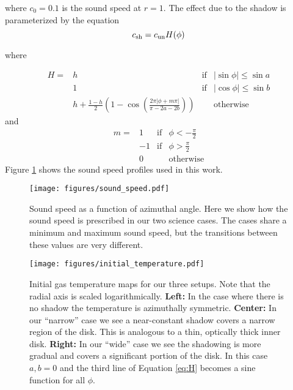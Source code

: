 \documentclass[twocolumn]{aastex631}
\begin{document}
where $c_0 = 0.1$ is the sound speed at $r=1$. The effect due to the shadow is parameterized by the equation
\begin{equation}
    c_{\rm sh} = c_{\rm un} H(\phi)
\end{equation}

where 

\begin{equation*}    
    \begin{array}{cccc}
        H = & h & \text{if} & |\sin{\phi}| \le \sin{a}  \\
            & 1 & \text{if} & |\cos{\phi}| \le \sin{b} \\
            & h + \frac{1-h}{2} \left (  1-\cos{\left ( \frac{2 \pi | \phi + m\pi |}{\pi - 2a - 2b}  \right )  } \right ) & & \text{otherwise}
    \end{array}
\end{equation*}
and
\begin{equation}
    \begin{array}{cccc}
        m = & 1 & \text{if} & \phi < -\frac{\pi}{2} \\
            & -1 & \text{if} & \phi > \frac{\pi}{2} \\
            & 0 & & \text{otherwise}
    \end{array}
    \label{eq:H}
\end{equation}
Figure \ref{fig:cs} shows the sound speed profiles used in this work.

\begin{figure}
    \begin{center}
        \texttt{[image: figures/sound\_speed.pdf]}
        \caption{Sound speed as a function of azimuthal angle. Here we show how the sound speed is prescribed in our two science cases. The cases
        share a minimum and maximum sound speed, but the transitions between these values are very different.}    
    \end{center}
    \label{fig:cs}
\end{figure}


\begin{figure*}
    \texttt{[image: figures/initial\_temperature.pdf]}
    \caption{Initial gas temperature maps for our three setups. Note that the radial axis is scaled logarithmically. {\bf Left:} In the case where there is no shadow the temperature is azimuthally symmetric.
    {\bf Center:} In our ``narrow'' case we see a near-constant shadow covers a narrow region of the disk. This is analogous to a thin, optically thick inner disk.
    {\bf Right:} In our ``wide'' case we see the shadowing is more gradual and covers a significant portion of the disk. In this case $a,b=0$ and the third line of
    Equation \ref{eq:H} becomes a sine function for all $\phi$.
    }
    \label{fig:setup}
\end{figure*}
\end{document}

